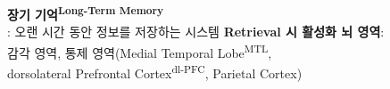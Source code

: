 \documentclass{beamer}
\begin{document}
\begin{frame}{\textbf{장기 기억\textsuperscript{Long-Term Memory}}\\\large{: 오랜 시간 동안 정보를 저장하는 시스템}}
  \textbf{Retrieval 시 활성화 뇌 영역}:\\
  감각 영역, 통제 영역(Medial Temporal Lobe\textsuperscript{MTL}, \\\qquad dorsolateral Prefrontal Cortex\textsuperscript{dl-PFC}, Parietal Cortex)
  \vspace{-3.5em}


\end{frame}
\end{document}
